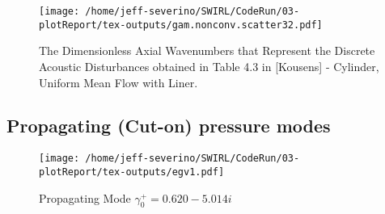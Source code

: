 \documentclass[a4paper]{article}
\begin{document}

 \begin{figure}
     \centering
     \texttt{[image: /home/jeff-severino/SWIRL/CodeRun/03-plotReport/tex-outputs/gam.nonconv.scatter32.pdf]}
     \caption{The Dimensionless Axial Wavenumbers that Represent the 
     Discrete Acoustic Disturbances obtained in Table 4.3 in [Kousens] -  Cylinder, Uniform Mean Flow with Liner.}
     \label{fig:1} 
 \end{figure}
 
 



\subsection{Propagating (Cut-on) pressure modes}

 \begin{figure}
     \centering
     \texttt{[image: /home/jeff-severino/SWIRL/CodeRun/03-plotReport/tex-outputs/egv1.pdf]}
     \caption{Propagating Mode $\gamma^+_0 = 0.620-5.014i$}
     \label{fig:2} 
 \end{figure}
\end{document}
